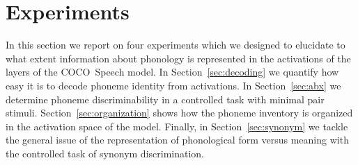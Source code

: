 \section{Experiments}
In this section we report on four experiments which we designed to
elucidate to what extent information about phonology is represented in
the activations of the layers of the COCO~Speech model. In
Section~\ref{sec:decoding} we quantify how easy it is to decode phoneme
identity from activations. In Section~\ref{sec:abx} we determine
phoneme discriminability in a controlled task with minimal pair
stimuli. Section~\ref{sec:organization} shows how the phoneme
inventory is organized in the activation space of the model. Finally,
in Section~\ref{sec:synonym} we tackle the general issue of the
representation of phonological form versus meaning with the controlled
task of synonym discrimination.





